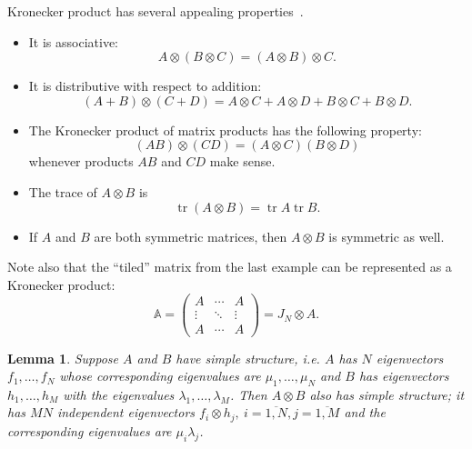 \documentclass[a4paper]{jpconf}
\newtheorem{nkjpcslem}{Lemma}
\begin{document}
Kronecker product has several appealing properties~\cite{bellman-matrices-kron}.
\begin{itemize}
\item It is associative:
    \[ A\otimes (B\otimes C) = (A\otimes B)\otimes C. \]
\item It is distributive with respect to addition:
    \[ (A+B)\otimes(C+D) = A\otimes C + A\otimes D + B\otimes C + B\otimes D. \]
\item The Kronecker product of matrix products has the following property:
    \[ (AB)\otimes(CD) = (A\otimes C)(B\otimes D) \]
    whenever products \( AB \) and \( CD \) make sense.
\item The trace of \( A\otimes B \) is \[ \operatorname{tr}(A\otimes B) = \operatorname{tr}A\operatorname{tr}B. \]
\item If \( A \) and \( B \) are both symmetric matrices,
      then \( A\otimes B \) is symmetric as well.
\end{itemize}
Note also that the ``tiled'' matrix from the last example
    can be represented as a Kronecker product:
\[
    \mathbb{A} =
    \begin{pmatrix}
    A & \cdots & A\\
    \vdots & \ddots & \vdots \\
    A & \cdots & A\end{pmatrix} =
        J_N\otimes A.
    \]

\begin{nkjpcslem}
Suppose \( A \) and \( B \) have simple structure,
    i.e. \( A \) has \( N \) eigenvectors
    \( f_1, \ldots, f_N \)
    whose corresponding eigenvalues are \( \mu_1, \ldots, \mu_N \)
    and \( B \) has eigenvectors \( h_1, \ldots, h_M \)
    with the eigenvalues \( \lambda_1, \ldots, \lambda_M \).
Then \( A\otimes B \) also has simple structure;
    it has \( MN \) independent eigenvectors \( f_i\otimes h_j,\ i{=}\overline{1,N}, j{=}\overline{1,M} \)
    and the corresponding eigenvalues are \( \mu_i \lambda_j \).
\end{nkjpcslem}
\end{document}
